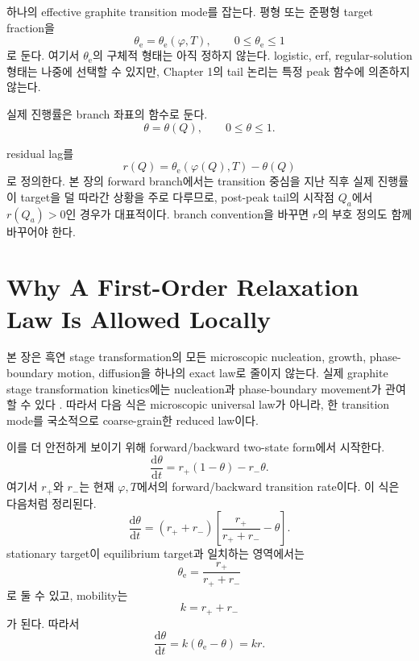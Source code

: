 \documentclass[11pt,a4paper]{article}
\newcommand{\dd}{\mathrm{d}}
\begin{document}
하나의 effective graphite transition mode를 잡는다. 평형 또는 준평형 target fraction을
\begin{equation}
\theta_{\mathrm e}=\theta_{\mathrm e}(\varphi,T),
\qquad
0\le\theta_{\mathrm e}\le1
\label{eq:thetae_def}
\end{equation}
로 둔다. 여기서 \(\theta_{\mathrm e}\)의 구체적 형태는 아직 정하지 않는다. logistic, erf, regular-solution 형태는 나중에 선택할 수 있지만, Chapter 1의 tail 논리는 특정 peak 함수에 의존하지 않는다.

실제 진행률은 branch 좌표의 함수로 둔다.
\begin{equation}
\theta=\theta(Q),
\qquad
0\le\theta\le1.
\label{eq:theta_def}
\end{equation}

residual lag를
\begin{equation}
r(Q)=\theta_{\mathrm e}(\varphi(Q),T)-\theta(Q)
\label{eq:residual_def_clean}
\end{equation}
로 정의한다. 본 장의 forward branch에서는 transition 중심을 지난 직후 실제 진행률이 target을 덜 따라간 상황을 주로 다루므로, post-peak tail의 시작점 \(Q_a\)에서 \(r(Q_a)>0\)인 경우가 대표적이다. branch convention을 바꾸면 \(r\)의 부호 정의도 함께 바꾸어야 한다.

\section{Why A First-Order Relaxation Law Is Allowed Locally}

본 장은 흑연 stage transformation의 모든 microscopic nucleation, growth, phase-boundary motion, diffusion을 하나의 exact law로 줄이지 않는다. 실제 graphite stage transformation kinetics에는 nucleation과 phase-boundary movement가 관여할 수 있다 \cite{Funabiki1999}. 따라서 다음 식은 microscopic universal law가 아니라, 한 transition mode를 국소적으로 coarse-grain한 reduced law이다.

이를 더 안전하게 보이기 위해 forward/backward two-state form에서 시작한다.
\begin{equation}
\frac{\dd\theta}{\dd t}
=
r_+(1-\theta)-r_-\theta .
\label{eq:forward_backward_clean}
\end{equation}
여기서 \(r_+\)와 \(r_-\)는 현재 \(\varphi,T\)에서의 forward/backward transition rate이다. 이 식은 다음처럼 정리된다.
\begin{equation}
\frac{\dd\theta}{\dd t}
=
(r_++r_-)
\left[
\frac{r_+}{r_++r_-}-\theta
\right].
\label{eq:fb_reduced_clean}
\end{equation}
stationary target이 equilibrium target과 일치하는 영역에서는
\begin{equation}
\theta_{\mathrm e}
=
\frac{r_+}{r_++r_-}
\label{eq:thetae_rate_ratio_clean}
\end{equation}
로 둘 수 있고, mobility는
\begin{equation}
k=r_++r_-
\label{eq:mobility_sum_clean}
\end{equation}
가 된다. 따라서
\begin{equation}
\boxed{
\frac{\dd\theta}{\dd t}
=
k\left(\theta_{\mathrm e}-\theta\right)
=kr .
}
\label{eq:first_order_clean}
\end{equation}
\end{document}

